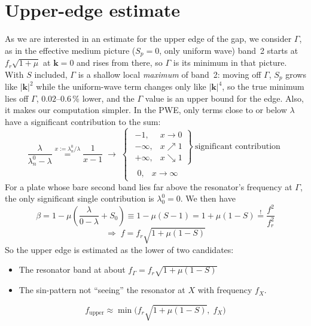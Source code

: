 \section{Upper-edge estimate}

As we are interested in an estimate for the upper edge of the gap, we consider
$\Gamma$, as in the effective medium picture ($S_p = 0$, only uniform wave)
band~2 starts at $f_r\sqrt{1+\mu}$ at $\mathbf{k} = 0$ and rises from there, so
$\Gamma$ is its minimum in that picture. With $S$ included, $\Gamma$ is
a shallow local \emph{maximum} of band~2: moving off $\Gamma$, $S_p$ grows like
$|\mathbf{k}|^2$ while the uniform-wave term changes only like
$|\mathbf{k}|^4$, so the true minimum lies off $\Gamma$, $0.02$--$0.6\,\%$
lower, and the $\Gamma$ value is an upper bound for the edge.
Also, it makes our computation simpler. In the PWE, only terms close to or below
$\lambda$ have a significant contribution to the sum:
\begin{equation}
  \frac{\lambda}{\lambda_n^0 - \lambda}
  \overset{x := \lambda_n^0/\lambda}{=}
  \frac{1}{x - 1}
  \;\to\;
  \left\{
  \begin{array}{l}
    \left.
    \begin{array}{ll}
      -1, & x \to 0 \\
      -\infty, & x \nearrow 1 \\
      +\infty, & x \searrow 1
    \end{array}
    \right\}\ \text{significant contribution} \\[2.2em]
    \begin{array}{ll}
      \;0, & x \to \infty
    \end{array}
  \end{array}
  \right.
\end{equation}
For a plate whose bare second band lies far above
the resonator's frequency at $\Gamma$, the only significant single contribution
is $\lambda_0^0 = 0$. We then have
\begin{equation}
  \beta = 1 - \mu\left(\frac{\lambda}{0 - \lambda} + S_0\right)
  \equiv 1 - \mu(S - 1) = 1 + \mu(1 - S) \overset{!}{=} \frac{f^2}{f_r^2}
\end{equation}
\begin{equation}
  \Rightarrow\; f = f_r\sqrt{1 + \mu(1 - S)}
\end{equation}
So the upper edge is estimated as the lower of two candidates:
\begin{itemize}
  \item The resonator band at about
        $f_\Gamma = f_r\sqrt{1 + \mu(1 - S)}$
  \item The sin-pattern not ``seeing'' the resonator at $X$ with frequency $f_X$.
\end{itemize}
\begin{equation}
  f_\text{upper} \approx \min\bigl(f_r\sqrt{1 + \mu(1 - S)},\; f_X\bigr)
  \label{eq:upper_edge_candidates}
\end{equation}

